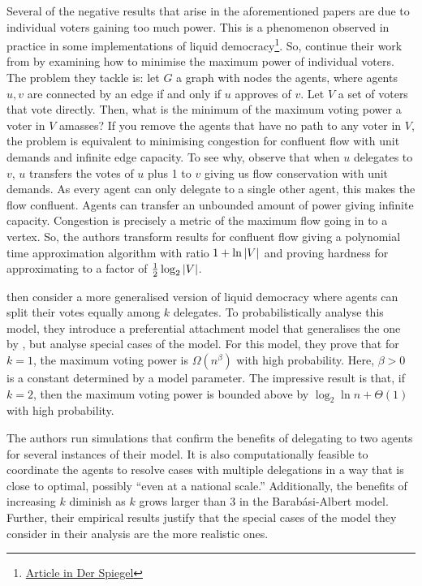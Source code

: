 \documentclass[11pt,a4paper, titlepage]{article}
\DeclarePairedDelimiter\abs{\lvert}{\rvert}
\theoremstyle{definition}
\begin{document}
Several of the negative results that arise in the aforementioned papers are due to individual voters gaining too much power.
This is a phenomenon observed in practice in some implementations of liquid democracy\footnote{\href{https://www.spiegel.de/international/germany/liquid-democracy-web-platform-makes-professor-most-powerful-pirate-a-818683.html}{Article in Der Spiegel}}. 
So, \citet{golz2021fluid} continue their work from \citet{kahng2021liquid} by examining how to minimise the maximum power of individual voters.
The problem they tackle is: let $G$ a graph with nodes the agents, where agents $u, v$ are connected by an edge if and only if $u$ approves of $v$. Let $V$ a set of voters that vote directly. Then, what is the minimum of the maximum voting power a voter in $V$ amasses?
If you remove the agents that have no path to any voter in $V$, the problem is equivalent to minimising congestion for confluent flow with unit demands and infinite edge capacity.
To see why, observe that when $u$ delegates to $v$, $u$ transfers the votes of $u$ plus 1 to $v$ giving us flow conservation with unit demands. 
As every agent can only delegate to a single other agent, this makes the flow confluent.
Agents can transfer an unbounded amount of power giving infinite capacity.
Congestion is precisely a metric of the maximum flow going in to a vertex. 
So, the authors transform results for confluent flow giving a polynomial time approximation algorithm with ratio $1 + \ln{\abs{V}}$ and proving hardness for approximating to a factor of $\frac{1}{2} \log_2{\abs{V}}$.

\citeauthor{golz2021fluid} then consider a more generalised version of liquid democracy where agents can split their votes equally among $k$ delegates.
To probabilistically analyse this model, they introduce a preferential attachment model that generalises the one by \citet{barabasi1999emergence}, but analyse special cases of the model.
For this model, they prove that for $k = 1$, the maximum voting power is $\Omega(n^\beta)$ with high probability. Here, $\beta > 0$ is a constant determined by a model parameter.
The impressive result is that, if $k = 2$, then the maximum voting power is bounded above by $\log_2{\ln n} + \Theta(1)$ with high probability.

The authors run simulations that confirm the benefits of delegating to two agents for several instances of their model.
It is also computationally feasible to coordinate the agents to resolve cases with multiple delegations in a way that is close to optimal, possibly ``even at a national scale.''
Additionally, the benefits of increasing $k$ diminish as $k$ grows larger than $3$ in the Barab{\'a}si-Albert model.
Further, their empirical results justify that the special cases of the model they consider in their analysis are the more realistic ones.
\end{document}
